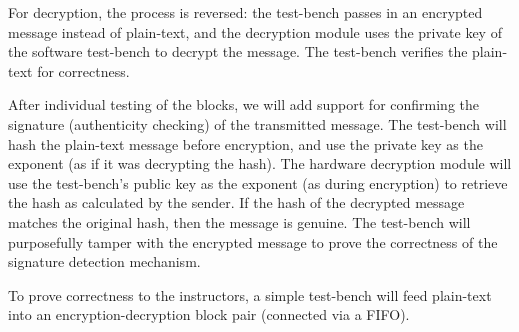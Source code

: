 \documentclass[12pt]{article}
\begin{document}
For decryption, the process is reversed: the test-bench passes in an 
encrypted message instead of plain-text, and the decryption module uses
the private key of the software test-bench to decrypt the message. The test-bench
verifies the plain-text for correctness.

After individual testing of the blocks, we will add support for confirming the signature
(authenticity checking) of the transmitted message. The test-bench will hash the plain-text
message before encryption, and use the private key as the exponent (as if it was decrypting
the hash). The hardware decryption module will use the test-bench's public key as the exponent
(as during encryption) to retrieve the hash as calculated by the sender. If the hash of the
decrypted message matches the original hash, then the message is genuine. The test-bench
will purposefully tamper with the encrypted message to prove the correctness of the 
signature detection mechanism. 

To prove correctness to the instructors, a simple test-bench will feed plain-text into an
encryption-decryption block pair (connected via a FIFO).
\end{document}
